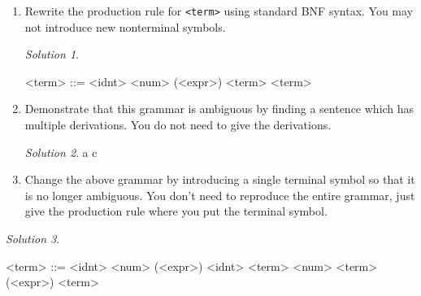 \documentclass{article}
\theoremstyle{remark} \newtheorem*{solution}{Solution}
\begin{document}
\begin{enumerate}
\pagebreak
\item
Rewrite the production rule for \texttt{<term>} using standard BNF
syntax.  You may not introduce new nonterminal symbols.
\begin{mdframed}
    \begin{solution}
        \begin{grammar}
            <term> ::= <idnt> \alt <num> \alt (<expr>) \alt <term> \lit*{\textvisiblespace} <term>
        \end{grammar}
    \end{solution}
\end{mdframed}
\item
Demonstrate that this grammar is ambiguous by finding a sentence which
has multiple derivations.  You do not need to give the derivations.
\begin{mdframed}
\begin{solution}

                \lit*a \lit*{\textvisiblespace}  \lit*{\textvisiblespace} \lit*c
\end{solution}
\end{mdframed}
\item
Change the above grammar by introducing a single terminal symbol so
that it is no longer ambiguous.  You don't need to reproduce the
entire grammar, just give the production rule where you put the
terminal symbol.
\end{enumerate}
\begin{mdframed}
    \begin{solution}
        \begin{grammar}
            <term> ::= <idnt> \alt <num> \alt (<expr>) \alt <idnt> \lit*{\textvisiblespace} <term> \alt <num> \lit*{\textvisiblespace} <term> \alt (<expr>) \lit*{\textvisiblespace} <term>
        \end{grammar}
    \end{solution}
\end{mdframed}





\pagebreak
\end{document}
